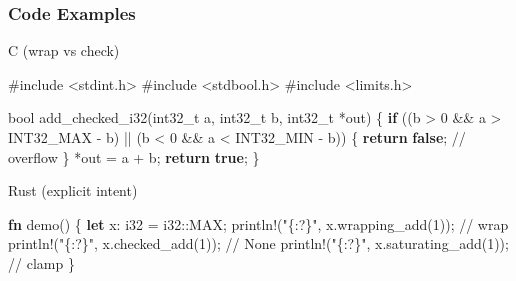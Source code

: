 \documentclass[
  letterpaper,
  DIV=11,
  numbers=noendperiod]{scrreprt}
\newenvironment{Shaded}{\begin{snugshade}}{\end{snugshade}}
\newcommand{\CommentTok}[1]{\textcolor[rgb]{0.37,0.37,0.37}{#1}}
\newcommand{\ConstantTok}[1]{\textcolor[rgb]{0.56,0.35,0.01}{#1}}
\newcommand{\ControlFlowTok}[1]{\textcolor[rgb]{0.00,0.23,0.31}{\textbf{#1}}}
\newcommand{\DataTypeTok}[1]{\textcolor[rgb]{0.68,0.00,0.00}{#1}}
\newcommand{\DecValTok}[1]{\textcolor[rgb]{0.68,0.00,0.00}{#1}}
\newcommand{\ImportTok}[1]{\textcolor[rgb]{0.00,0.46,0.62}{#1}}
\newcommand{\KeywordTok}[1]{\textcolor[rgb]{0.00,0.23,0.31}{\textbf{#1}}}
\newcommand{\NormalTok}[1]{\textcolor[rgb]{0.00,0.23,0.31}{#1}}
\newcommand{\OperatorTok}[1]{\textcolor[rgb]{0.37,0.37,0.37}{#1}}
\newcommand{\PreprocessorTok}[1]{\textcolor[rgb]{0.68,0.00,0.00}{#1}}
\newcommand{\StringTok}[1]{\textcolor[rgb]{0.13,0.47,0.30}{#1}}
\begin{document}
\subsubsection{Code Examples}\label{code-examples}

C (wrap vs check)

\begin{Shaded}
\begin{Highlighting}[]
\PreprocessorTok{\#include }\ImportTok{\textless{}stdint.h\textgreater{}}
\PreprocessorTok{\#include }\ImportTok{\textless{}stdbool.h\textgreater{}}
\PreprocessorTok{\#include }\ImportTok{\textless{}limits.h\textgreater{}}

\DataTypeTok{bool}\NormalTok{ add\_checked\_i32}\OperatorTok{(}\DataTypeTok{int32\_t}\NormalTok{ a}\OperatorTok{,} \DataTypeTok{int32\_t}\NormalTok{ b}\OperatorTok{,} \DataTypeTok{int32\_t} \OperatorTok{*}\NormalTok{out}\OperatorTok{)} \OperatorTok{\{}
    \ControlFlowTok{if} \OperatorTok{((}\NormalTok{b }\OperatorTok{\textgreater{}} \DecValTok{0} \OperatorTok{\&\&}\NormalTok{ a }\OperatorTok{\textgreater{}}\NormalTok{ INT32\_MAX }\OperatorTok{{-}}\NormalTok{ b}\OperatorTok{)} \OperatorTok{||}
        \OperatorTok{(}\NormalTok{b }\OperatorTok{\textless{}} \DecValTok{0} \OperatorTok{\&\&}\NormalTok{ a }\OperatorTok{\textless{}}\NormalTok{ INT32\_MIN }\OperatorTok{{-}}\NormalTok{ b}\OperatorTok{))} \OperatorTok{\{}
        \ControlFlowTok{return} \KeywordTok{false}\OperatorTok{;} \CommentTok{// overflow}
    \OperatorTok{\}}
    \OperatorTok{*}\NormalTok{out }\OperatorTok{=}\NormalTok{ a }\OperatorTok{+}\NormalTok{ b}\OperatorTok{;}
    \ControlFlowTok{return} \KeywordTok{true}\OperatorTok{;}
\OperatorTok{\}}
\end{Highlighting}
\end{Shaded}

Rust (explicit intent)

\begin{Shaded}
\begin{Highlighting}[]
\KeywordTok{fn}\NormalTok{ demo() }\OperatorTok{\{}
    \KeywordTok{let}\NormalTok{ x}\OperatorTok{:} \DataTypeTok{i32} \OperatorTok{=} \DataTypeTok{i32}\PreprocessorTok{::}\ConstantTok{MAX}\OperatorTok{;}
    \PreprocessorTok{println!}\NormalTok{(}\StringTok{"\{:?\}"}\OperatorTok{,}\NormalTok{ x}\OperatorTok{.}\NormalTok{wrapping\_add(}\DecValTok{1}\NormalTok{))}\OperatorTok{;}   \CommentTok{// wrap}
    \PreprocessorTok{println!}\NormalTok{(}\StringTok{"\{:?\}"}\OperatorTok{,}\NormalTok{ x}\OperatorTok{.}\NormalTok{checked\_add(}\DecValTok{1}\NormalTok{))}\OperatorTok{;}    \CommentTok{// None}
    \PreprocessorTok{println!}\NormalTok{(}\StringTok{"\{:?\}"}\OperatorTok{,}\NormalTok{ x}\OperatorTok{.}\NormalTok{saturating\_add(}\DecValTok{1}\NormalTok{))}\OperatorTok{;} \CommentTok{// clamp}
\OperatorTok{\}}
\end{Highlighting}
\end{Shaded}
\end{document}
